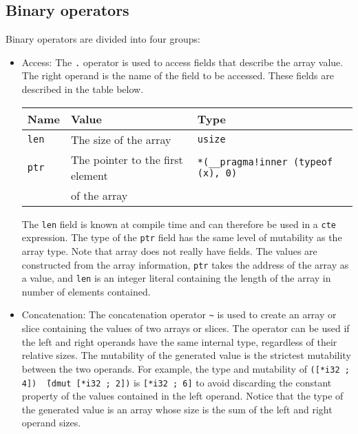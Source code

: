 \subsection {Binary operators}

Binary operators are divided into four groups:

\begin{itemize}
\item Access: The \texttt{.} operator is used to access fields that describe the
  array value. The right operand is the name of the field to be accessed. These
  fields are described in the table below.

\begin{center}\begin{adjustbox}{max width=\linewidth}
  \begin{tabular}{|l|ll|}
    \hline
    Name & Value & Type\\
    \hline
    \hline
    \texttt{len} & The size of the array & \texttt{usize} \\
    \texttt{ptr} & The pointer to the first element  & \texttt{*(\_\_pragma!inner (typeof (x), 0)} \\
    & of the array & \\
    \hline
  \end{tabular}
\end{adjustbox}\end{center}

The \texttt{len} field is known at compile time and can therefore be used in
a \texttt{cte} expression. The type of the \texttt{ptr} field has the same
level of mutability as the array type. Note that array does not really have
fields. The values are constructed from the array information, \texttt{ptr}
takes the address of the array as a value, and \texttt{len} is an integer
literal containing the length of the array in number of elements contained.

\item Concatenation: The concatenation operator \texttt{\~} is used to create an
  array or slice containing the values of two arrays or slices. The operator can
  be used if the left and right operands have the same internal type, regardless
  of their relative sizes. The mutability of the generated value is the
  strictest mutability between the two operands. For example, the type and
  mutability of \texttt{([*i32 ; 4]) \~\ (dmut [*i32 ; 2])} is \texttt{[*i32 ;
      6]} to avoid discarding the constant property of the values contained in
  the left operand. Notice that the type of the generated value is an array
  whose size is the sum of the left and right operand sizes.


\end{itemize}
